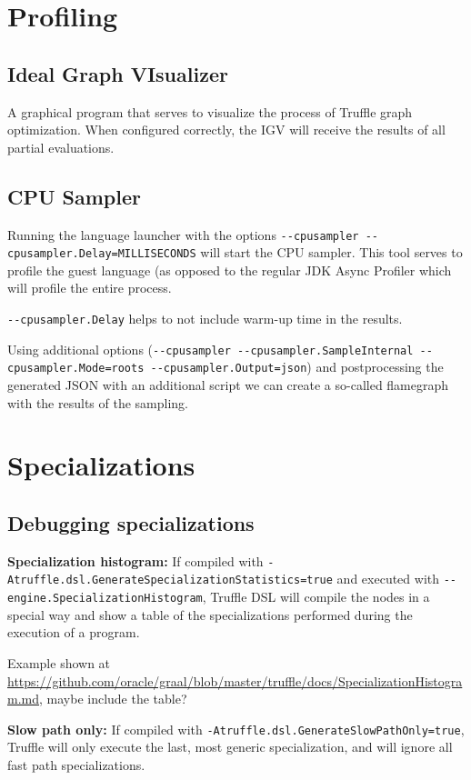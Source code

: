 \documentclass[english,zadani,odsaz]{fitthesis}
\begin{document}
\section{Profiling}
\label{sec:orgfdb1f9d}
\subsection{Ideal Graph VIsualizer}
\label{sec:org5c89a95}
A graphical program that serves to visualize the process of Truffle graph
optimization. When configured correctly, the IGV will receive the results of all
partial evaluations.

\subsection{CPU Sampler}
\label{sec:orgd40da8c}
Running the language launcher with the options \texttt{-{}-cpusampler
-{}-cpusampler.Delay=MILLISECONDS} will start the CPU sampler. This tool serves to
profile the guest language (as opposed to the regular JDK Async Profiler which
will profile the entire process.

\texttt{-{}-cpusampler.Delay} helps to not include warm-up time in the results.

Using additional options (\texttt{-{}-cpusampler -{}-cpusampler.SampleInternal
-{}-cpusampler.Mode=roots -{}-cpusampler.Output=json}) and postprocessing the
generated JSON with an additional script we
can create a so-called flamegraph with the results of the sampling.

\section{Specializations}
\label{sec:org59f6718}
\subsection{Debugging specializations}
\label{sec:orgf225aa5}
\textbf{Specialization histogram:} If compiled with
\texttt{-Atruffle.dsl.GenerateSpecializationStatistics=true} and executed with
\texttt{-{}-engine.SpecializationHistogram}, Truffle DSL will compile the nodes in a
special way and show a table of the specializations performed during the execution of a
program.

Example shown at
\url{https://github.com/oracle/graal/blob/master/truffle/docs/SpecializationHistogram.md},
maybe include the table?

\textbf{Slow path only:} If compiled with \texttt{-Atruffle.dsl.GenerateSlowPathOnly=true},
Truffle will only execute the last, most generic specialization, and will
ignore all fast path specializations.
\end{document}
